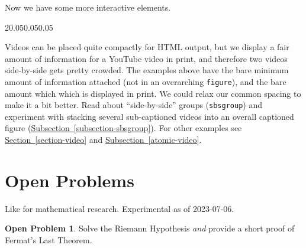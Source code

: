 \documentclass{amsart}
\theoremstyle{plain}%
\theoremstyle{definition}%
\newtheorem{openproblem}[theorem]{Open Problem}
\theoremstyle{remark}%
\newcommand{\xreffont}{\relax}
\newcommand{\mono}[1]{\texttt{#1}}
\numberwithin{equation}{section}
\begin{document}
Now we have some more interactive elements.%
\begin{sidebyside}{2}{0.05}{0.05}{0.05}%
\end{sidebyside}%
\par
Videos can be placed quite compactly for HTML output, but we display a fair amount of information for a YouTube video in print, and therefore two videos side-by-side gets pretty crowded.  The examples above have the bare minimum amount of information attached (not in an overarching \mono{figure}), and the bare amount which which is displayed in print.  We could relax our common spacing to make it a bit better.  Read about ``side-by-side'' groups (\mono{sbsgroup}) and experiment with stacking several sub-captioned videos into an overall captioned figure (\hyperref[subsection-sbsgroup]{Subsection~{\xreffont\ref{subsection-sbsgroup}}}).  For other examples see \hyperref[section-video]{Section~{\xreffont\ref{section-video}}} and \hyperref[atomic-video]{Subsection~{\xreffont\ref{atomic-video}}}.%
%
%
\typeout{************************************************}
\typeout{************************************************}
%
\section{Open Problems}\label{section-open-problems}%
Like for mathematical research.  Experimental as of 2023-07-06.%
\begin{openproblem}\label{section-open-problems-3}%
%
Solve the Riemann Hypothesis\footnotemark{} \emph{and} provide a short proof of Fermat's Last Theorem.%
\end{openproblem}
%
%
%
\typeout{************************************************}
\typeout{************************************************}
%
\end{document}
